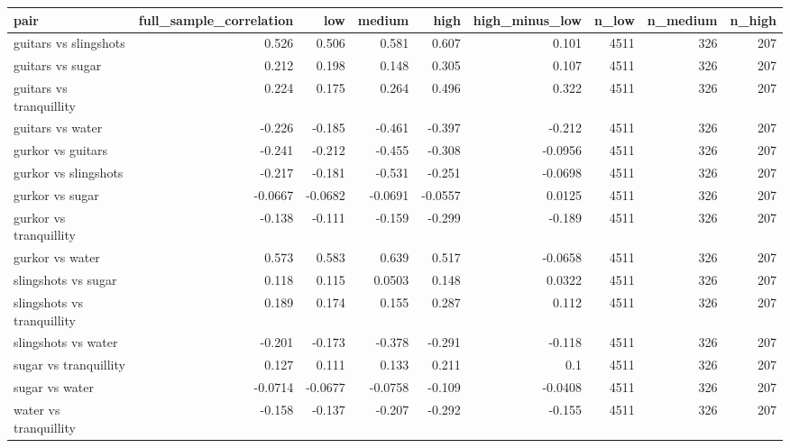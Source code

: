 \begin{tabular}{lrrrrrrrr}
\toprule
pair & full_sample_correlation & low & medium & high & high_minus_low & n_low & n_medium & n_high \\
\midrule
guitars vs slingshots & 0.526 & 0.506 & 0.581 & 0.607 & 0.101 & 4511 & 326 & 207 \\
guitars vs sugar & 0.212 & 0.198 & 0.148 & 0.305 & 0.107 & 4511 & 326 & 207 \\
guitars vs tranquillity & 0.224 & 0.175 & 0.264 & 0.496 & 0.322 & 4511 & 326 & 207 \\
guitars vs water & -0.226 & -0.185 & -0.461 & -0.397 & -0.212 & 4511 & 326 & 207 \\
gurkor vs guitars & -0.241 & -0.212 & -0.455 & -0.308 & -0.0956 & 4511 & 326 & 207 \\
gurkor vs slingshots & -0.217 & -0.181 & -0.531 & -0.251 & -0.0698 & 4511 & 326 & 207 \\
gurkor vs sugar & -0.0667 & -0.0682 & -0.0691 & -0.0557 & 0.0125 & 4511 & 326 & 207 \\
gurkor vs tranquillity & -0.138 & -0.111 & -0.159 & -0.299 & -0.189 & 4511 & 326 & 207 \\
gurkor vs water & 0.573 & 0.583 & 0.639 & 0.517 & -0.0658 & 4511 & 326 & 207 \\
slingshots vs sugar & 0.118 & 0.115 & 0.0503 & 0.148 & 0.0322 & 4511 & 326 & 207 \\
slingshots vs tranquillity & 0.189 & 0.174 & 0.155 & 0.287 & 0.112 & 4511 & 326 & 207 \\
slingshots vs water & -0.201 & -0.173 & -0.378 & -0.291 & -0.118 & 4511 & 326 & 207 \\
sugar vs tranquillity & 0.127 & 0.111 & 0.133 & 0.211 & 0.1 & 4511 & 326 & 207 \\
sugar vs water & -0.0714 & -0.0677 & -0.0758 & -0.109 & -0.0408 & 4511 & 326 & 207 \\
water vs tranquillity & -0.158 & -0.137 & -0.207 & -0.292 & -0.155 & 4511 & 326 & 207 \\
\bottomrule
\end{tabular}
